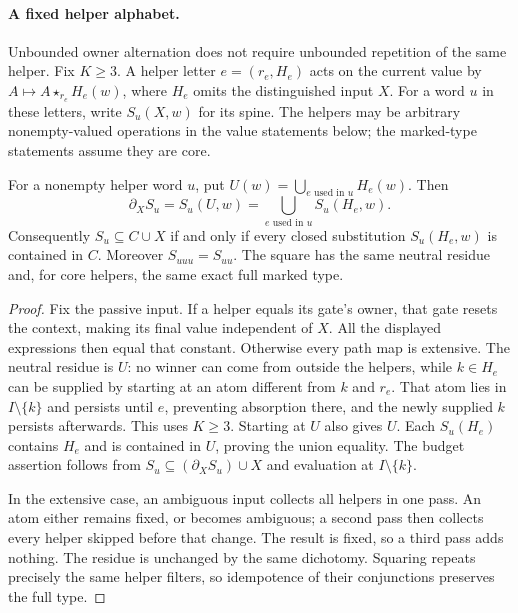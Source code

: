 \paragraph{A fixed helper alphabet.}
Unbounded owner alternation does not require unbounded repetition of the
same helper. Fix $K\geq3$. A helper letter $e=(r_e,H_e)$ acts on the current value by
$A\mapsto A\star_{r_e}H_e(w)$, where $H_e$ omits the distinguished input
$X$. For a word $u$ in these letters, write $S_u(X,w)$ for its spine.
The helpers may be arbitrary nonempty-valued operations in the value
statements below; the marked-type statements assume they are core.

\begin{lemma}
\label{core:lem:spine-neutral-closure}
For a nonempty helper word $u$, put
$U(w)=\bigcup_{e\text{ used in }u}H_e(w)$. Then
\[
 \partial_XS_u=S_u(U,w)
   =\bigcup_{e\text{ used in }u}S_u(H_e,w).
\]
Consequently $S_u\subseteq C\cup X$ if and only if every closed
substitution $S_u(H_e,w)$ is contained in $C$.
Moreover $S_{uuu}=S_{uu}$. The square has the same neutral residue
and, for core helpers, the same exact full marked type.
\end{lemma}
\begin{proof}
Fix the passive input. If a helper equals its gate's owner, that gate
resets the context, making its final value independent of $X$.
All the displayed expressions then equal that constant.
Otherwise every path map is extensive. The neutral residue is $U$:
no winner can come from outside the helpers, while $k\in H_e$ can
be supplied by starting at an atom different from $k$ and $r_e$.
That atom lies in $I\setminus\{k\}$ and persists until $e$, preventing absorption there,
and the newly supplied $k$ persists afterwards. This uses $K\geq3$.
Starting at $U$ also gives $U$. Each $S_u(H_e)$ contains $H_e$ and
is contained in $U$, proving the union equality.
The budget assertion follows from
$S_u\subseteq(\partial_XS_u)\cup X$ and evaluation at $I\setminus\{k\}$.

In the extensive case, an ambiguous input collects all helpers in
one pass. An atom either remains fixed, or becomes ambiguous; a second
pass then collects every helper skipped before that change. The result
is fixed, so a third pass adds nothing. The residue is unchanged by
the same dichotomy. Squaring repeats precisely the same helper filters,
so idempotence of their conjunctions preserves the full type.
\end{proof}

